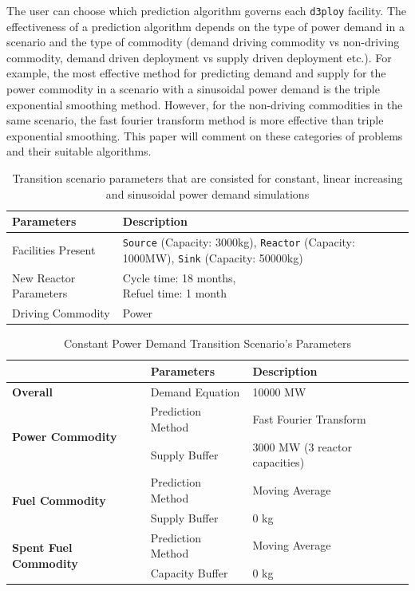 \documentclass{anstrans}
\newcommand{\deploy}{\texttt{d3ploy}\xspace}%
\begin{document}
The user can choose which prediction algorithm governs each
\deploy facility. 
The effectiveness of a prediction algorithm depends on the type 
of power demand in a scenario and the type of commodity (demand 
driving commodity vs non-driving commodity, demand driven 
deployment vs supply driven deployment etc.). 
For example, the most effective method
for predicting demand and supply for the power commodity in a scenario  
with a sinusoidal power demand is the triple exponential smoothing method. 
However, for the non-driving commodities in the same 
scenario, the fast fourier transform method is more effective than triple 
exponential smoothing. 
This paper will comment on these categories of problems and their suitable
algorithms. 

\begin{table}[!htb]
    \centering
    \caption {Transition scenario parameters that are consisted for constant, linear increasing and sinusoidal power demand simulations}
	\label{tab:transition-scenario-all}
    \begin{tabular}{|l|p{4.5cm}|}
    \hline
    \textbf{Parameters}    & \textbf{Description} \\ \hline
    Facilities Present     & \texttt{Source} (Capacity: 3000kg), \texttt{Reactor} (Capacity: 1000MW), \texttt{Sink} (Capacity: 50000kg)      \\ \hline
    New Reactor Parameters & \shortstack[l]{Cycle time: 18 months, \\ Refuel time: 1 month}\\ \hline
    Driving Commodity & Power \\ \hline
    \end{tabular}
\end{table}

\begin{table}[!htb]
    \centering
    \caption {Constant Power Demand Transition Scenario's Parameters}
	\label{tab:transition-scenario-constant-power}
    \begin{tabular}{|l|l|p{4.5cm}|}
    \hline
                                     & \textbf{Parameters}    & \textbf{Description} \\ \hline
    \textbf{Overall}& Demand Equation & 10000 MW \\ \hline
    \multirow{2}{*}{\textbf{Power Commodity}} & Prediction Method      &  Fast Fourier Transform\\ \cline{2-3} 
                                     & Supply Buffer          &  3000 MW (3 reactor capacities)\\ \hline
    \multirow{2}{*}{\textbf{Fuel Commodity}}  & Prediction Method      &  Moving Average\\ \cline{2-3}
                                     & Supply Buffer & 0 kg \\ \hline
    \multirow{2}{*}{\textbf{Spent Fuel Commodity}}  & Prediction Method      &  Moving Average\\ \cline{2-3}
                                     & Capacity Buffer & 0 kg \\ \hline
    \end{tabular}
\end{table}
\end{document}

